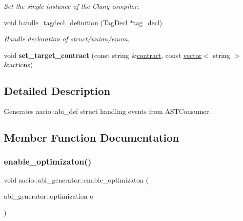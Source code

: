 \begin{DoxyCompactItemize}
\begin{DoxyCompactList}\small\item\em Set the single instance of the Clang compiler. \end{DoxyCompactList}\item 
void \mbox{\hyperlink{classaacio_1_1abi__generator_a8bebfb455bc896b0aa03815965ee0afd}{handle\+\_\+tagdecl\+\_\+definition}} (Tag\+Decl $\ast$tag\+\_\+decl)
\begin{DoxyCompactList}\small\item\em Handle declaration of struct/union/enum. \end{DoxyCompactList}\item 
\mbox{\label{classaacio_1_1abi__generator_a622f2b60a99b16b27c5a714e667b4ae3}} 
void {\bfseries set\+\_\+target\+\_\+contract} (const string \&\mbox{\hyperlink{structaacio_1_1contract}{contract}}, const \mbox{\hyperlink{classstd_1_1vector}{vector}}$<$ string $>$ \&actions)
\end{DoxyCompactItemize}


\subsection{Detailed Description}
Generates aacio\+::abi\+\_\+def struct handling events from A\+S\+T\+Consumer. 

\subsection{Member Function Documentation}
\mbox{\label{classaacio_1_1abi__generator_a97a49b2ddf02669e5dbb6554ac352ac5}} 
\subsubsection{\texorpdfstring{enable\+\_\+optimizaton()}{enable\_optimizaton()}}
{\footnotesize\ttfamily void aacio\+::abi\+\_\+generator\+::enable\+\_\+optimizaton (\begin{DoxyParamCaption}\item[{abi\+\_\+generator\+::optimization}]{o }\end{DoxyParamCaption})}



